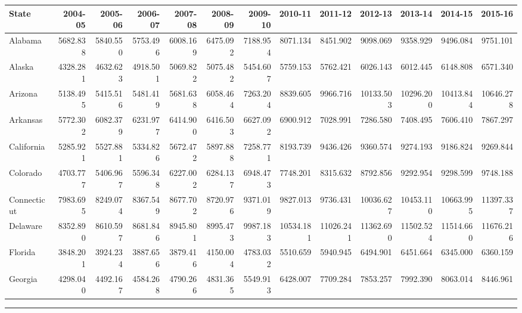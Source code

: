 \documentclass[
]{book}
\begin{document}
\begin{tabular}{l|r|r|r|r|r|r|r|r|r|r|r|r}
\hline
State & 2004-05 & 2005-06 & 2006-07 & 2007-08 & 2008-09 & 2009-10 & 2010-11 & 2011-12 & 2012-13 & 2013-14 & 2014-15 & 2015-16\\
\hline
Alabama & 5682.838 & 5840.550 & 5753.496 & 6008.169 & 6475.092 & 7188.954 & 8071.134 & 8451.902 & 9098.069 & 9358.929 & 9496.084 & 9751.101\\
\hline
Alaska & 4328.281 & 4632.623 & 4918.501 & 5069.822 & 5075.482 & 5454.607 & 5759.153 & 5762.421 & 6026.143 & 6012.445 & 6148.808 & 6571.340\\
\hline
Arizona & 5138.495 & 5415.516 & 5481.419 & 5681.638 & 6058.464 & 7263.204 & 8839.605 & 9966.716 & 10133.503 & 10296.200 & 10413.844 & 10646.278\\
\hline
Arkansas & 5772.302 & 6082.379 & 6231.977 & 6414.900 & 6416.503 & 6627.092 & 6900.912 & 7028.991 & 7286.580 & 7408.495 & 7606.410 & 7867.297\\
\hline
California & 5285.921 & 5527.881 & 5334.826 & 5672.472 & 5897.888 & 7258.771 & 8193.739 & 9436.426 & 9360.574 & 9274.193 & 9186.824 & 9269.844\\
\hline
Colorado & 4703.777 & 5406.967 & 5596.348 & 6227.002 & 6284.137 & 6948.473 & 7748.201 & 8315.632 & 8792.856 & 9292.954 & 9298.599 & 9748.188\\
\hline
Connecticut & 7983.695 & 8249.074 & 8367.549 & 8677.702 & 8720.976 & 9371.019 & 9827.013 & 9736.431 & 10036.627 & 10453.110 & 10663.995 & 11397.337\\
\hline
Delaware & 8352.890 & 8610.597 & 8681.846 & 8945.801 & 8995.473 & 9987.183 & 10534.181 & 11026.241 & 11362.690 & 11502.524 & 11514.660 & 11676.216\\
\hline
Florida & 3848.201 & 3924.234 & 3887.656 & 3879.416 & 4150.004 & 4783.032 & 5510.659 & 5940.945 & 6494.901 & 6451.664 & 6345.000 & 6360.159\\
\hline
Georgia & 4298.040 & 4492.167 & 4584.268 & 4790.266 & 4831.365 & 5549.913 & 6428.007 & 7709.284 & 7853.257 & 7992.390 & 8063.014 & 8446.961\\
\hline
\end{tabular}

\begin{center}\rule{0.5\linewidth}{0.5pt}\end{center}
\end{document}
